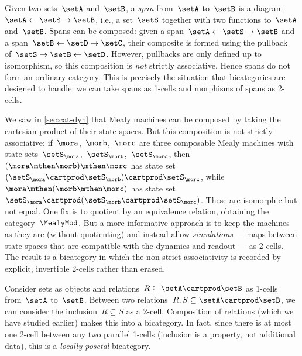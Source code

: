 \begin{example}
    \label{exa:bicat-motivation-span}
    Given two sets~$\setA$ and~$\setB$, a \emph{span} from~$\setA$ to~$\setB$ is a diagram~$\setA \leftarrow \setS \rightarrow \setB$, i.e., a set~$\setS$ together with two functions to~$\setA$ and~$\setB$.
    Spans can be composed: given a span~$\setA \leftarrow \setS \rightarrow \setB$ and a span~$\setB \leftarrow \setD \rightarrow \setC$, their composite is formed using the pullback of~$\setS \rightarrow \setB \leftarrow \setD$.
    However, pullbacks are only defined up to isomorphism, so this composition is \emph{not} strictly associative.
    Hence spans do not form an ordinary category.
    This is precisely the situation that bicategories are designed to handle: we can take spans as 1-cells and morphisms of spans as 2-cells.
\end{example}

\begin{example}
    \label{exa:bicat-motivation-mealy}
    We saw in \cref{sec:cat-dyn} that Mealy machines can be composed by taking the cartesian product of their state spaces.
    But this composition is not strictly associative: if~$\mora$,~$\morb$,~$\morc$ are three composable Mealy machines with state sets~$\setS_\mora$,~$\setS_\morb$,~$\setS_\morc$, then~$(\mora \mthen \morb) \mthen \morc$ has state set~$(\setS_\mora \cartprod \setS_\morb) \cartprod \setS_\morc$, while~$\mora \mthen (\morb \mthen \morc)$ has state set~$\setS_\mora \cartprod (\setS_\morb \cartprod \setS_\morc)$.
    These are isomorphic but not equal.
    One fix is to quotient by an equivalence relation, obtaining the category~$\MealyMod$.
    But a more informative approach is to keep the machines as they are (without quotienting) and instead allow \emph{simulations} --- maps between state spaces that are compatible with the dynamics and readout --- as 2-cells.
    The result is a bicategory in which the non-strict associativity is recorded by explicit, invertible 2-cells rather than erased.
\end{example}

\begin{example}[Relations]
    \label{exa:bicat-motivation-rel}
    Consider sets as objects and relations~$R \subseteq \setA \cartprod \setB$ as 1-cells from~$\setA$ to~$\setB$.
    Between two relations~$R, S \subseteq \setA \cartprod \setB$, we can consider the inclusion~$R \subseteq S$ as a 2-cell.
    Composition of relations (which we have studied earlier) makes this into a bicategory.
    In fact, since there is at most one 2-cell between any two parallel 1-cells (inclusion is a property, not additional data), this is a \emph{locally posetal} bicategory.
\end{example}

